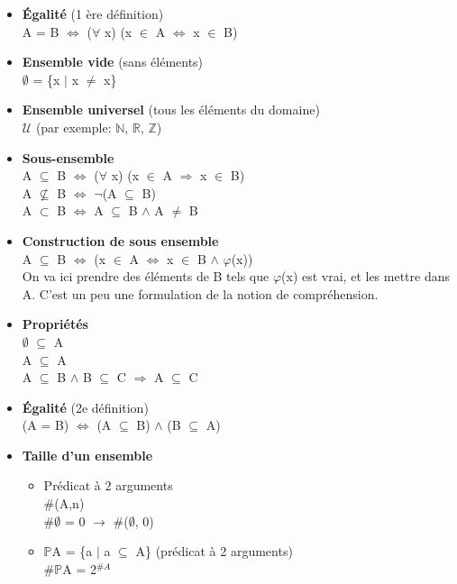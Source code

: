 \begin{itemize}
\item \textbf{Égalité} (1 ère définition) \\
A = B $\Leftrightarrow$ ($\forall$ x) (x $\in$ A $\Leftrightarrow$ x $\in$ B)\\
\item \textbf{Ensemble vide} (sans éléments)\\
$\emptyset$ = \{x $\vert$ x $\neq$ x\}\\
\item \textbf{Ensemble universel} (tous les éléments du domaine)\\
$\mathcal{U}$ (par exemple: $\mathbb{N}$, $\mathbb{R}$, $\mathbb{Z}$)\\
\item \textbf{Sous-ensemble}\\
A $\subseteq$ B $\Leftrightarrow$ ($\forall$ x) (x $\in$ A $\Rightarrow$ x $\in$ B)\\
A $\nsubseteq$ B $\Leftrightarrow$ $\neg$(A $\subseteq$ B)\\
A $\subset$ B $\Leftrightarrow$ A $\subseteq$ B $\wedge$ A $\neq$ B\\
\item \textbf{Construction de sous ensemble} \\
A $\subseteq$ B $\Leftrightarrow$ (x $\in$ A $\Leftrightarrow$ x $\in$ B $\wedge$ $\varphi$(x))\\
On va ici prendre des éléments de B tels que $\varphi$(x) est vrai, et les mettre dans A. C'est un peu une formulation de la notion de compréhension.\\ 
\item \textbf{Propriétés}\\
$\emptyset$ $\subseteq$ A\\
A $\subseteq$ A\\
A $\subseteq$ B $\wedge$ B $\subseteq$ C $\Rightarrow$ A $\subseteq$ C \\
\item \textbf{Égalité} (2e définition)\\
(A = B) $\Leftrightarrow$ (A $\subseteq$ B) $\wedge$ (B $\subseteq$ A)\\
\item \textbf{Taille d'un ensemble} 
    \begin{itemize}
    \item Prédicat à 2 arguments\\
    \#(A,n) \\
    \#$\emptyset$ = 0  $\rightarrow$ \#($\emptyset$, 0) 
    \item $\mathbb{P}$A = \{a $\vert$ a $\subseteq$ A\} (prédicat à 2 arguments)\\
    \#$\mathbb{P}$A = 2$^{\#A}$ \\
    \end{itemize}
\end{itemize}

